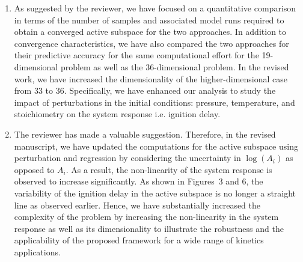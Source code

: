 \documentclass[11pt,final]{article}
\newcommand{\referee}[1]{\vspace{.1ex}\noindent{\textcolor{blue}{#1}}}
\begin{document}
\begin{enumerate}[wide, labelwidth=!, labelindent=0pt]
\item \referee{There is a lack of quantitative discussion of the expense of
regression-vs-perturbation, in terms of the actual number of model simulations
required. The work seems to suggest that perturbation works better than
regression, but then it is a direct and clear consequence of the fact that
local approximation is supposed to be better than a global one. Ideally, much
more quantitative comparison needs to be made here before reaching any
meaningful conclusions.}

As suggested by the reviewer, we have focused on a quantitative
comparison in terms of the number of samples and associated model runs required
to obtain a converged active subspace for the two approaches. In addition to
convergence characteristics, we have also compared the two approaches for their
predictive accuracy for the same computational effort for the 19-dimensional
problem as well as the 36-dimensional problem. In the revised work, we have
increased the dimensionality of the higher-dimensional case from 33 to 36.
Specifically, we have enhanced our analysis to study the impact of
perturbations in the initial conditions: pressure, temperature, and
stoichiometry on the system response i.e. ignition delay.

\item \referee{Another fundamental flaw is related to the additive treatment of
the uncertainty of the pre-exponential factor A. In most works dealing with
uncertainty in chemical kinetics, the uncertainty form is multiplicative or,
equivalently, log(A) is the underlying fundamental parameter with additive
uncertainty range. In the current form of the uncertainty, the problem is too
benign, and barely carries any practical usability for the practitioners.}

The reviewer has made a valuable suggestion. Therefore, in the
revised manuscript, we have updated the computations for the active subspace
using perturbation and regression by considering the uncertainty in $\log(A_i)$
as opposed to $A_i$.  As a result, the non-linearity of the system response is
observed to increase significantly. As shown in Figures~3 and 6, the
variability of the ignition delay in the active subspace is no longer a
straight line as observed earlier. Hence, we have substantially increased the
complexity of the problem by increasing the non-linearity in the system
response as well as its dimensionality to illustrate the robustness and the
applicability of the proposed framework for a wide range of kinetics
applications. 


\end{enumerate}
\end{document}
